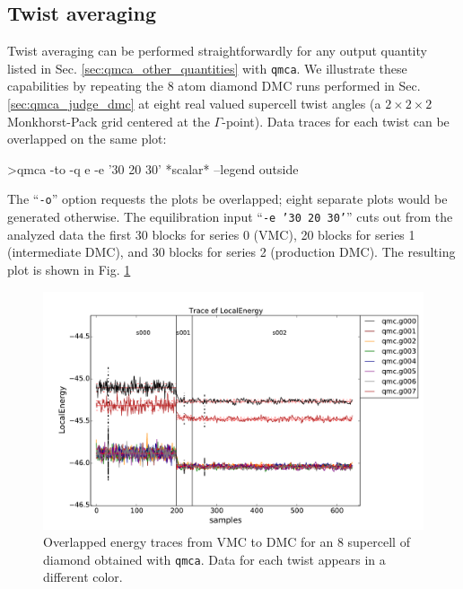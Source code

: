 \subsection{Twist averaging}
\label{sec:qmca_twist_average}
Twist averaging can be performed straightforwardly for any 
output quantity listed in Sec. \ref{sec:qmca_other_quantities} 
with \texttt{qmca}.  We illustrate these capabilities by 
repeating the 8 atom diamond DMC runs performed in Sec. 
\ref{sec:qmca_judge_dmc} at eight real valued supercell twist 
angles (a $2\times 2\times 2$ Monkhorst-Pack grid centered at 
the $\Gamma$-point).  Data traces for each twist can be overlapped 
on the same plot:
\begin{shade}
>qmca -to -q e -e '30 20 30' *scalar* --legend outside
\end{shade}
\noindent
The ``\texttt{-o}'' option requests the plots be overlapped; 
eight separate plots would be generated otherwise.  The 
equilibration input ``\texttt{-e '30 20 30'}'' cuts out from 
the analyzed data the first 30 blocks for series 0 (VMC), 
20 blocks for series 1 (intermediate DMC), and 30 blocks for 
series 2 (production DMC).  The resulting plot is shown in 
Fig. \ref{fig:qmca_twist_overlap}

\begin{figure}
\begin{center}
\includegraphics[trim = 0mm 0mm 0mm 0mm, clip,width=0.9\columnwidth]{figures/qmca_twist_trace_overlap.pdf}
\end{center}
\caption{Overlapped energy traces from VMC to DMC for an 8 supercell of diamond obtained with \texttt{qmca}.  Data for each twist appears in a different color.
\label{fig:qmca_twist_overlap}
}
\end{figure}

